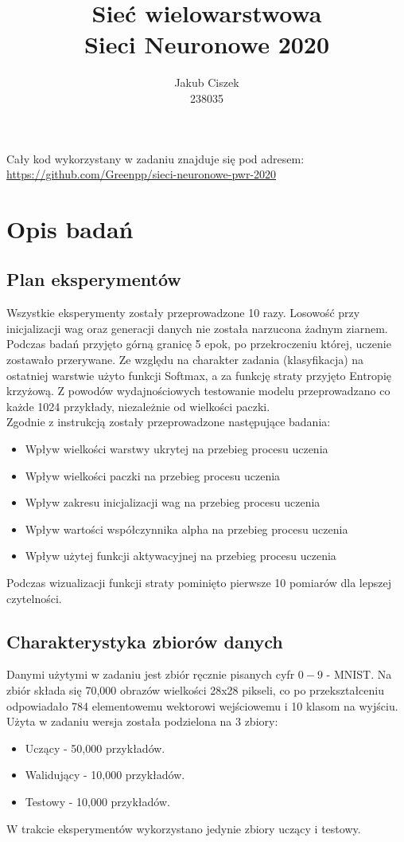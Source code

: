 \documentclass{article}
\title{  Sieć wielowarstwowa\\Sieci Neuronowe 2020 }
\author{
  Jakub Ciszek \\
  238035\\
}
\begin{document}
\maketitle

\newpage
\tableofcontents
\newpage

Cały kod wykorzystany w zadaniu znajduje się pod adresem: \url{https://github.com/Greenpp/sieci-neuronowe-pwr-2020}

\section{Opis badań}
\subsection{Plan eksperymentów}

Wszystkie eksperymenty zostały przeprowadzone 10 razy. Losowość przy inicjalizacji wag oraz generacji danych nie została narzucona żadnym ziarnem. Podczas badań przyjęto górną granicę 5 epok, po przekroczeniu której, uczenie zostawało przerywane. Ze względu na charakter zadania (klasyfikacja) na ostatniej warstwie użyto funkcji Softmax, a za funkcję straty przyjęto Entropię krzyżową.
Z powodów wydajnościowych testowanie modelu przeprowadzano co każde 1024 przykłady, niezależnie od wielkości paczki.\\
Zgodnie z instrukcją zostały przeprowadzone następujące badania:
\begin{itemize}
	\item Wpływ wielkości warstwy ukrytej na przebieg procesu uczenia
	\item Wpływ wielkości paczki na przebieg procesu uczenia
	\item Wpływ zakresu inicjalizacji wag na przebieg procesu uczenia
	\item Wpływ wartości współczynnika alpha na przebieg procesu uczenia
	\item Wpływ użytej funkcji aktywacyjnej na przebieg procesu uczenia     
\end{itemize}
Podczas wizualizacji funkcji straty pominięto pierwsze 10 pomiarów dla lepszej czytelności.

\subsection{Charakterystyka zbiorów danych}

Danymi użytymi w zadaniu jest zbiór ręcznie pisanych cyfr \(0-9\) - MNIST. Na zbiór składa się 70,000 obrazów wielkości 28x28 pikseli, co po przekształceniu odpowiadało 784 elementowemu wektorowi wejściowemu i 10 klasom na wyjściu. Użyta w zadaniu wersja została podzielona na 3 zbiory:
\begin{itemize}
	\item Uczący - 50,000 przykładów.
	\item Walidujący - 10,000 przykładów.
	\item Testowy - 10,000 przykładów.
\end{itemize}
W trakcie eksperymentów wykorzystano jedynie zbiory uczący i testowy.
\end{document}
